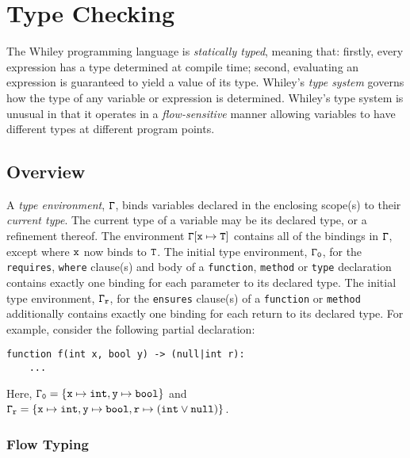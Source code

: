 \newcommand{\tenv}{\Gamma}
\newcommand{\ftype}[3]{#1\vdash #2\dashv #3}

\chapter{Type Checking}
The Whiley programming language is {\em statically typed}, meaning
that: firstly, every expression has a type determined at compile time;
second, evaluating an expression is guaranteed to yield a value of its
type.  Whiley's {\em type system} governs how the type of any variable
or expression is determined.  Whiley's type system is unusual in that
it operates in a {\em flow-sensitive} manner allowing variables to
have different types at different program points.

\section{Overview}

A {\em type environment}, ${\tt\tenv}$, binds variables declared in
the enclosing scope(s) to their {\em current type}.  The current type
of a variable may be its declared type, or a refinement thereof.  The
environment ${\tt\tenv[x\mapsto T]}$ contains all of the bindings in
${\tt\tenv}$, except where ${\tt x}$ now binds to ${\tt T}$.  The
initial type environment, ${\tt\tenv_0}$, for the
\lstinline{requires}, \lstinline{where} clause(s) and body of a
\lstinline{function}, \lstinline{method} or \lstinline{type}
declaration contains exactly one binding for each parameter to its
declared type.  The initial type environment, ${\tt\tenv_r}$, for the
\lstinline{ensures} clause(s) of a \lstinline{function} or
\lstinline{method} additionally contains exactly one binding for each
return to its declared type.  For example, consider the following
partial declaration:
\begin{lstlisting}
function f(int x, bool y) -> (null|int r):
    ...
\end{lstlisting}
Here, ${\tt\tenv_0=\{x\mapsto int, y\mapsto bool\}}$ and
${\tt\tenv_r=\{x\mapsto int, y\mapsto bool, r\mapsto(int\lor null)\}}$.

\subsection{Flow Typing}

